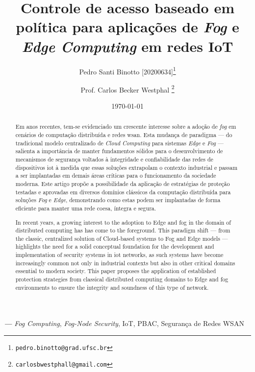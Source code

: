 \documentclass[12pt]{article}
\title{Controle de acesso baseado em política para aplicações de \textit{Fog} e \textit{Edge Computing} em redes IoT}
\author[1]{Pedro Santi Binotto [20200634]\thanks{\texttt{pedro.binotto@grad.ufsc.br}}}
\author[1]{Prof. Carlos Becker Westphal \thanks{\texttt{carlosbwestphall@gmail.com}}}
\date{\today}
\affil[1]{Departamento de Informática e Estatística, Centro Tecnológico \protect\\ Universidade Federal de Santa Catarina}
\providecommand{\keywords}[1]{%
  \small
  \textbf{\textit{\iflanguage{english}{Keywords}{Palavras-chave} ---}} #1%
}
\begin{document}
\begin{titlepage}
\maketitle
\thispagestyle{empty}

\begin{abstract}
  Em anos recentes, tem-se evidenciado um crescente interesse sobre a adoção de \textit{\gls{fog}} em
  cenários de computação distribuída e redes \gls{wsan}. Esta mudança de paradigma --- do tradicional modelo
  centralizado de \textit{Cloud Computing} para sistemas \textit{Edge} e \textit{Fog} --- salienta a importância de manter
  fundamentos sólidos para o desenvolvimento de mecanismos de segurança voltados à integridade e confiabilidade das redes
  de dispositivos \gls{iot} à medida que essas soluções extrapolam o contexto industrial e passam a ser implantadas em
  demais áreas críticas para o funcionamento da sociedade moderna. Este artigo propõe a possibilidade
  da aplicação de estratégias de proteção testadas e aprovadas em diversos domínios clássicos da computação distribuída
  para soluções \textit{Fog} e \textit{Edge}, demonstrando como estas podem ser implantadas de forma eficiente para
  manter uma rede coesa, íntegra e segura.
\end{abstract}

\begin{abstract}
  In recent years, a growing interest to the adoption to Edge and \gls{fog} in the domain of distributed computing has
  has come to the foreground. This paradigm shift --- from the classic, centralized solution of Cloud-based systems to
  Fog and Edge models --- highlights the need for a solid conceptual foundation for the development and implementation
  of security systems in \gls{iot} networks, as such systems have become increasingly common not only in industrial
  contexts but also in other critical domains essential to modern society. This paper proposes the application of
  established protection strategies from classical distributed computing domains to Edge and \gls{fog} environments to
  ensure the integrity and soundness of this type of network.
\end{abstract}


\keywords{\textit{Fog Computing}, \textit{Fog-Node Security}, IoT, PBAC, Segurança de Redes WSAN}

\end{titlepage}
\end{document}
